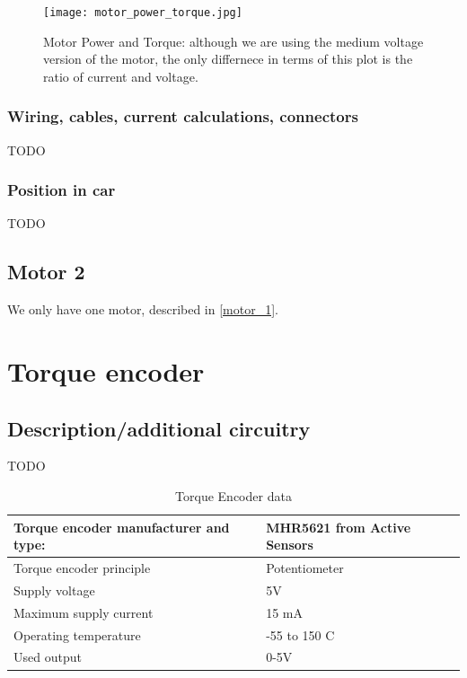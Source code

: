 \documentclass{article}
\begin{document}

\begin{figure}[H]
    \centering
    \texttt{[image: motor\_power\_torque.jpg]}
    \caption{Motor Power and Torque: although we are using the medium voltage version of the motor, the only differnece in terms of this plot is the ratio of current and voltage. }
    \label{motor_power_torque}
\end{figure}


\subsubsection{Wiring, cables, current calculations, connectors}
TODO

\subsubsection{Position in car}
TODO

\subsection{Motor 2}\label{motor_2}
We only have one motor, described in \ref{motor_1}.

\section{Torque encoder}\label{torque_encoder}
\subsection{Description/additional circuitry}
TODO

\begin{table}[H]
	\centering
	\begin{tabular}{|l|l|}
	\hline
	Torque encoder manufacturer and type: & MHR5621 from Active Sensors \\ \hline
	Torque encoder principle & Potentiometer \\ \hline
	Supply voltage & 5V \\ \hline
	Maximum supply current & 15 mA \\ \hline
	Operating temperature & -55 to 150 \degree C \\ \hline
	Used output & 0-5V \\ \hline
	\end{tabular}
	\caption{Torque Encoder data}
	\label{encoder}
\end{table}
\end{document}
